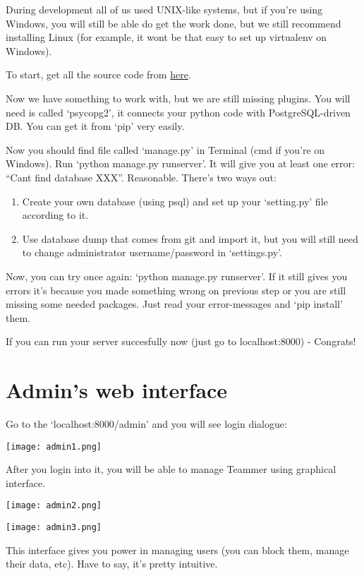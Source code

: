 \documentclass{report}
\begin{document}
During development all of us used UNIX-like systems, but if you’re using Windows, you will still be able do get the work done, but we still recommend installing Linux (for example, it wont be that easy to set up virtualenv on Windows).

To start, get all the source code from \href{https://github.com/destinityx2/Teammer}{here}.

Now we have something to work with, but we are still missing plugins. You will need is called ‘psycopg2’, it connects your python code with PostgreSQL-driven DB. You can get it from ‘pip’ very easily.

Now you should find file called ‘manage.py’ in Terminal (cmd if you’re on Windows).
Run ‘python manage.py runserver’. It will give you at least one error: “Cant find database XXX”. Reasonable.
There’s two ways out:
\begin{enumerate}
\item Create your own database (using psql) and set up your ‘setting.py’ file according to it.
\item Use database dump that comes from git and import it, but you will still need to change administrator username/password in ‘settings.py’.
\end{enumerate}

Now, you can try once again: ‘python manage.py runserver’.
If it still gives you errors it’s because you made something wrong on previous step or you are still missing some needed packages. Just read your error-messages and ‘pip install’ them.

If you can run your server succesfully now (just go to localhost:8000) - Congrats!

\section{Admin’s web interface}
Go to the ‘localhost:8000/admin’ and you will see login dialogue:
\begin{center}
\texttt{[image: admin1.png]}
\end{center}
After you login into it, you will be able to manage Teammer using graphical interface.
\begin{center}
\texttt{[image: admin2.png]}
\end{center}
\begin{center}
\texttt{[image: admin3.png]}
\end{center}

This interface gives you power in managing users (you can block them, manage their data, etc). Have to say, it’s pretty intuitive.
\end{document}
